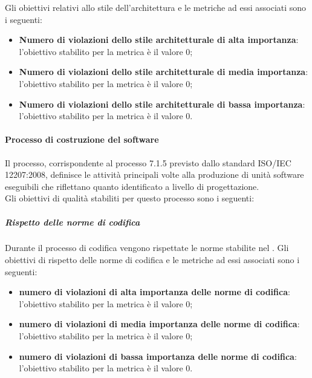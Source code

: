				Gli obiettivi relativi allo stile dell'architettura e le metriche ad essi associati sono i seguenti:
		 		\begin{itemize}
					\item \textbf{Numero di violazioni dello stile architetturale di alta importanza}: l'obiettivo stabilito per la metrica è il valore 0;
					\item \textbf{Numero di violazioni dello stile architetturale di media importanza}: l'obiettivo stabilito per la metrica è il valore 0;
					\item \textbf{Numero di violazioni dello stile architetturale di bassa importanza}: l'obiettivo stabilito per la metrica è il valore 0.
				\end{itemize}
				
			\paragraph{Processo di costruzione del software}
			Il processo, corrispondente al processo 7.1.5 previsto dallo standard ISO/IEC 12207:2008, definisce le attività principali volte alla produzione di unità software eseguibili che riflettano quanto identificato a livello di progettazione.
			\\Gli obiettivi di qualità stabiliti per questo processo sono i seguenti:
				\subparagraph{Rispetto delle norme di codifica}
				Durante il processo di codifica vengono rispettate le norme stabilite nel \NdP{}.
				Gli obiettivi di rispetto delle norme di codifica e le metriche ad essi associati sono i seguenti:
		 		\begin{itemize}
					\item \textbf{numero di violazioni di alta importanza delle norme di codifica}: l'obiettivo stabilito per la metrica è il valore 0;
					\item \textbf{numero di violazioni di media importanza delle norme di codifica}: l'obiettivo stabilito per la metrica è il valore 0;
					\item \textbf{numero di violazioni di bassa importanza delle norme di codifica}: l'obiettivo stabilito per la metrica è il valore 0.
				\end{itemize}
				
